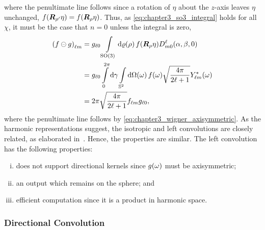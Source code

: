 %
where the penultimate line follows since a rotation of \({\eta}\) about the \(z\)-axis leaves \({\eta}\) unchanged, \ie{} \(f(\rotationMatrix[']\eta) = f(\rotationMatrix\eta)\).
Thus, as \cref{eq:chapter3_so3_integral} holds for all \(\chi{}\), it must be the case that \(n=0\) unless the integral is zero, \ie{}
%
\begin{align}
	\harmonic{(f \circleddash g)}
	 & = \axiHarmonic{g} \integrateRotation{\rho} f(\rotationMatrix\eta) \wigner{\ell}{m}{0} (\alpha,\beta,0) \nonumber{}                                    \\
	 & = \axiHarmonic{g} \int\limits_{0}^{2\pi} \dd{\gamma} \integrateSphere{\omega} \pixel{f} \sqrt{\inverseFactor} \pixel{\conj{\harmonic{Y}}} \nonumber{} \\
	 & = 2\pi \sqrt{\inverseFactor} \harmonic{f} \axiHarmonic{g},
\end{align}
%
where the penultimate line follows by \cref{eq:chapter3_wigner_axisymmetric}.
As the harmonic representations suggest, the isotropic and left convolutions are closely related, as elaborated in~\cite{Kennedy2011}.
Hence, the properties are similar.
The left convolution has the following properties:
%
\begin{enumerate}[(i),nosep,left=\parindent]
	\item does not support directional kernels since \(\pixel{g}\) must be axisymmetric;
	\item an output which remains on the sphere; and
	\item efficient computation since it is a product in harmonic space.
\end{enumerate}

\subsubsection{Directional Convolution}

